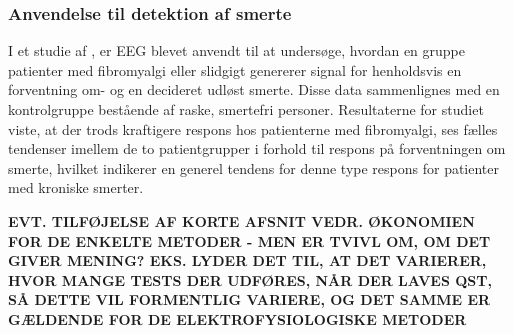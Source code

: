 \subsubsection{Anvendelse til detektion af smerte}
I et studie af \citep{7}, er EEG blevet anvendt til at undersøge, hvordan en gruppe patienter med fibromyalgi eller slidgigt genererer signal for henholdsvis en forventning om- og en decideret udløst smerte. Disse data sammenlignes med en kontrolgruppe bestående af raske, smertefri personer. Resultaterne for studiet viste, at der trods kraftigere respons hos patienterne med fibromyalgi, ses fælles tendenser imellem de to patientgrupper i forhold til respons på forventningen om smerte, hvilket indikerer en generel tendens for denne type respons for patienter med kroniske smerter. \citep{7}
   
\textbf{EVT. TILFØJELSE AF KORTE AFSNIT VEDR. ØKONOMIEN FOR DE ENKELTE METODER - MEN ER TVIVL OM, OM DET GIVER MENING? EKS. LYDER DET TIL, AT DET VARIERER, HVOR MANGE TESTS DER UDFØRES, NÅR DER LAVES QST, SÅ DETTE VIL FORMENTLIG VARIERE, OG DET SAMME ER GÆLDENDE FOR DE ELEKTROFYSIOLOGISKE METODER}
